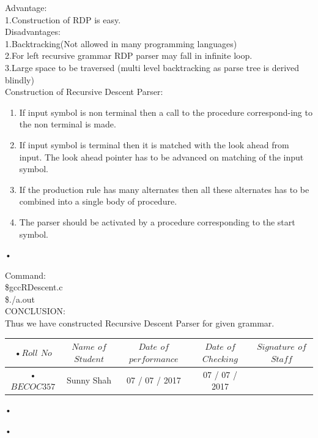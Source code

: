 \documentclass[11pt]{article}
\begin{document}
	\noindent
	Advantage:\\
	1.Construction of RDP is easy.\\
	
	\noindent
	Disadvantages:\\
	1.Backtracking(Not allowed in many programming languages)\\
	2.For left recursive grammar RDP parser may fall in infinite loop.\\
	3.Large space to be traversed (multi level backtracking as parse tree is derived blindly)\\
	
	\noindent
	Construction of Recursive Descent Parser:\\
	\begin{enumerate}
		\item If input symbol is non terminal then a call to the procedure correspond-ing to the non terminal is made.
		\item If input symbol is terminal then it is matched with the look ahead from input. The look ahead pointer has to be advanced on matching of the input symbol.
		\item If the production rule has many alternates then all these alternates has to be combined into a single body of procedure.
		\item The parser should be activated by a procedure corresponding to the start symbol.
		
	\end{enumerate}•
	
	\noindent
	Command:\\
	\$gccRDescent.c\\
	\$./a.out\\
	
	\noindent
	CONCLUSION:\\
	Thus we have constructed Recursive Descent Parser for given grammar.\\
	
	\begin{center}
		\begin{tabular}{|c|c|c|c|c|}
			•$Roll$ $No$ & $Name$ $of$ $Student$ & $Date$ $of$ $performance$ & $Date$ $of$ $Checking$ & $Signature$ $of$ $Staff$ \\ \hline
			•$BECOC357$ & Sunny Shah& 07 / 07 / 2017& 07 / 07 / 2017 &  \\ \hline
		\end{tabular}•
	\end{center}•
	
	\newpage
\end{document}
